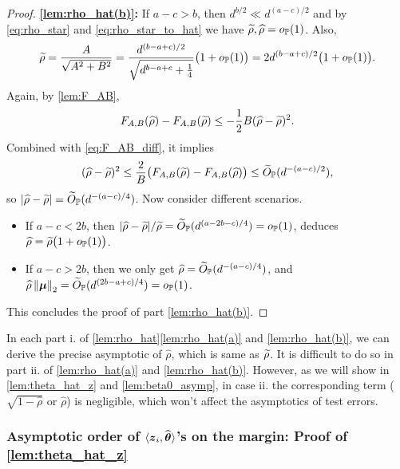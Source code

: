 \begin{proof}
\vspace{0.5\baselineskip}
\noindent
\textbf{\ref{lem:rho_hat(b)}:}
If $a - c > b$, then $d^{b/2} \ll d^{(a-c)/2}$ and by \cref{eq:rho_star} and \eqref{eq:rho_star_to_hat} we have $\widetilde\rho, \widehat\rho = o_{\mathbb{P}}(1)$. Also,
\begin{equation*}
    \widetilde\rho = 
    \frac{A}{\sqrt{A^2 + B^2}}
    = \frac{d^{(b-a+c)/2}}{\sqrt{ d^{b-a+c} + \frac14 }}  \bigl(1 + o_{\mathbb{P}}(1)\bigr)
    = 2d^{(b-a+c)/2} \bigl(1 + o_{\mathbb{P}}(1)\bigr).
\end{equation*}
Again, by \cref{lem:F_AB},
\begin{equation*}
    F_{A,B}(\widehat\rho) - F_{A,B}(\widetilde\rho) \le -\frac12 B(\widehat\rho - \widetilde\rho)^2.
\end{equation*}
Combined with \cref{eq:F_AB_diff}, it implies
\begin{equation*}
    (\widehat\rho - \widetilde\rho)^2 \le  \frac{2}{B}\bigl( F_{A,B}(\widetilde\rho) - F_{A,B}(\widehat\rho) \bigr) \le \widetilde O_{\mathbb{P}}(d^{-(a-c)/2}),
\end{equation*}
so $|\widehat\rho - \widetilde\rho| = \widetilde O_{\mathbb{P}}(d^{-(a-c)/4})$. Now consider different scenarios.
\begin{itemize}
    \item If $a - c < 2b$, then $|\widehat \rho - \widetilde\rho|/\widetilde\rho = \widetilde O_{\mathbb{P}}(d^{(a - 2b -c)/4}) = o_{\mathbb{P}}(1)$, deduces $\widehat \rho = \widetilde\rho \bigl(1 + o_{\mathbb{P}}(1)\bigr)$.
    \item If $a - c > 2b$, then we only get $\widehat \rho = \widetilde O_{\mathbb{P}}(d^{-(a-c)/4})$, and $\widehat \rho \left\|{{\boldsymbol{\mu}}}\right\|_2 = \widetilde O_{\mathbb{P}}(d^{(2b-a+c)/4}) = o_{\mathbb{P}}(1)$.
\end{itemize}
This concludes the proof of part \ref{lem:rho_hat(b)}.
\end{proof}
\begin{rem}
    In each part i. of \cref{lem:rho_hat}\ref{lem:rho_hat(a)} and \ref{lem:rho_hat(b)}, we can derive the precise asymptotic of $\hat\rho$, which is same as $\widetilde\rho$. It is difficult to do so in part ii. of \ref{lem:rho_hat(a)} and \ref{lem:rho_hat(b)}. However, as we will show in \cref{lem:theta_hat_z} and \ref{lem:beta0_asymp}, in case ii. the corresponding term ($\sqrt{1 - \hat\rho}$ or $\hat\rho$) is negligible, which won't affect the asymptotics of test errors.
\end{rem}


\subsubsection{Asymptotic order of $\langle\text{\boldmath $z$}_i, \widehat{{\boldsymbol{\theta}}} \rangle$'s on the margin: Proof of \cref{lem:theta_hat_z}}


